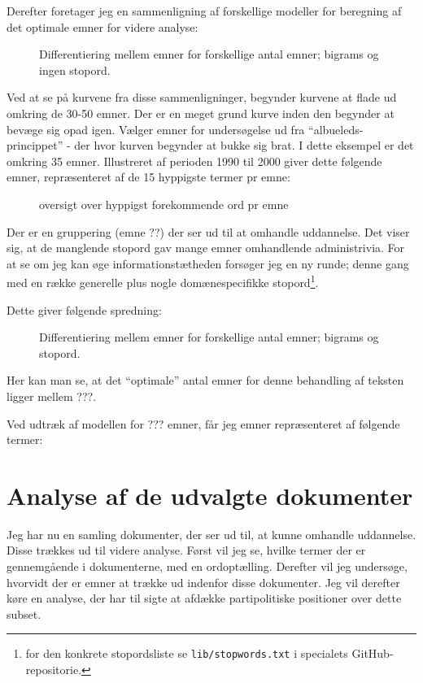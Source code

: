 Derefter foretager jeg en sammenligning af forskellige modeller for beregning af det optimale emner for videre analyse:

\begin{figure}[H]
\centering

\caption{Differentiering mellem emner for forskellige antal emner; bigrams og ingen stopord. }
\end{figure}

Ved at se på kurvene fra disse sammenligninger, begynder kurvene at flade ud omkring de 30-50 emner.
Der er en meget grund kurve inden den begynder at bevæge sig opad igen.
Vælger emner for undersøgelse ud fra “albueleds-princippet” - der hvor kurven begynder at bukke sig brat.
I dette eksempel er det omkring 35 emner.
Illustreret af perioden 1990 til 2000 giver dette følgende emner, repræsenteret af de 15 hyppigste termer pr emne:

\begin{figure}[H]
  \small
\centering

\caption{oversigt over hyppigst forekommende ord pr emne}
\end{figure}


Der er en gruppering (emne ??) der ser ud til at omhandle uddannelse.
Det viser sig, at de manglende stopord gav mange emner omhandlende administrivia. For at se om jeg kan øge informationstætheden forsøger jeg en ny runde; denne gang med en række generelle plus nogle domænespecifikke stopord\footnote{for den konkrete stopordsliste se \texttt{lib/stopwords.txt} i specialets GitHub-repositorie.}.

Dette giver følgende spredning:

\begin{figure}[H]
\centering

\caption{Differentiering mellem emner for forskellige antal emner; bigrams og stopord. }
\end{figure}

Her kan man se, at det “optimale” antal emner for denne behandling af teksten ligger mellem ???.

Ved udtræk af modellen for ??? emner, får jeg emner repræsenteret af følgende termer:

\chapter{Analyse af de udvalgte dokumenter}

Jeg har nu en samling dokumenter, der ser ud til, at kunne omhandle uddannelse.
Disse trækkes ud til videre analyse.
Først vil jeg se, hvilke termer der er gennemgående i dokumenterne, med en ordoptælling.
Derefter vil jeg undersøge, hvorvidt der er emner at trække ud indenfor disse dokumenter.
Jeg vil derefter køre en analyse, der har til sigte at afdække partipolitiske positioner over dette subset.

